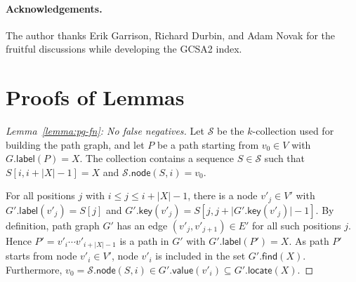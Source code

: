 \documentclass[twoside,leqno,twocolumn]{article}
\newcommand{\abs}[1]{\ensuremath{\lvert #1 \rvert}}
\newcommand{\find}{\ensuremath{\mathsf{find}}}
\newcommand{\locate}{\ensuremath{\mathsf{locate}}}
\newcommand{\glabel}{\ensuremath{\mathsf{label}}}
\newcommand{\gkey}{\ensuremath{\mathsf{key}}}
\newcommand{\gvalue}{\ensuremath{\mathsf{value}}}
\newcommand{\gnode}{\ensuremath{\mathsf{node}}}
\newcommand{\kcollection}[1]{$#1$\nobreakdash-collection}
\begin{document}


\paragraph{Acknowledgements.} The author thanks Erik Garrison, Richard Durbin, and Adam Novak for the fruitful discussions while developing the GCSA2 index.






\appendix
\section{Proofs of Lemmas}\label{appendix:proofs}

\begin{proof}[Lemma~\ref{lemma:pg-fn}: No false negatives]
Let $\mathcal{S}$ be the \kcollection{k} used for building the path graph, and let $P$ be a path starting from $v_{0} \in V$ with $G.\glabel(P) = X$. The collection contains a sequence $S \in \mathcal{S}$ such that $S[i, i+\abs{X}-1] = X$ and $\mathcal{S}.\gnode(S, i) = v_{0}$.

For all positions $j$ with $i \le j \le i+\abs{X}-1$, there is a node $v'_{j} \in V'$ with $G'.\glabel(v'_{j}) = S[j]$ and $G'.\gkey(v'_{j}) = S[j, j+\abs{G'.\gkey(v'_{j})}-1]$.
By definition, path graph $G'$ has an edge $(v'_{j}, v'_{j+1}) \in E'$ for all such positions $j$.
Hence $P' = v'_{i} \dotsm v'_{i+\abs{X}-1}$ is a path in $G'$ with $G'.\glabel(P') = X$.
As path $P'$ starts from node $v'_{i} \in V'$, node $v'_{i}$ is included in the set $G'.\find(X)$.
Furthermore, $v_{0} = \mathcal{S}.\gnode(S, i) \in G'.\gvalue(v'_{i}) \subseteq G'.\locate(X)$.
\end{proof}
\end{document}
